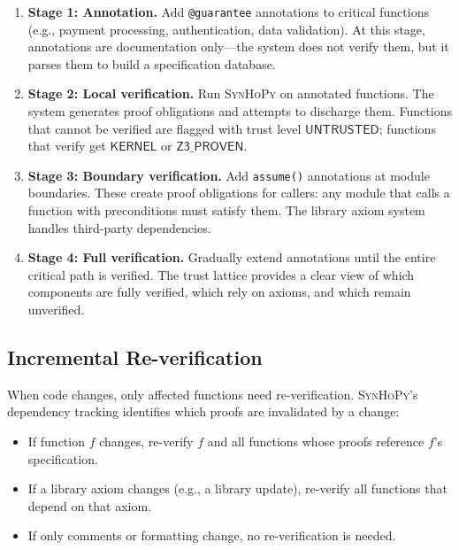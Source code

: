 \documentclass[11pt,a4paper]{report}
\theoremstyle{definition}
\theoremstyle{plain}
\newcommand{\synhopy}{\textsc{SynHoPy}}
\begin{document}
\begin{enumerate}
  \item \textbf{Stage 1: Annotation.}  Add \lstinline[style=synhopy]{@guarantee}
    annotations to critical functions (e.g., payment processing, authentication,
    data validation).  At this stage, annotations are documentation only---the
    system does not verify them, but it parses them to build a specification
    database.

  \item \textbf{Stage 2: Local verification.}  Run \synhopy{} on annotated
    functions.  The system generates proof obligations and attempts to discharge
    them.  Functions that cannot be verified are flagged with trust level
    $\mathsf{UNTRUSTED}$; functions that verify get $\mathsf{KERNEL}$ or
    $\mathsf{Z3\_PROVEN}$.

  \item \textbf{Stage 3: Boundary verification.}  Add
    \lstinline[style=synhopy]{assume()} annotations at module boundaries.
    These create proof obligations for callers: any module that calls a
    function with preconditions must satisfy them.  The library axiom system
    handles third-party dependencies.

  \item \textbf{Stage 4: Full verification.}  Gradually extend annotations
    until the entire critical path is verified.  The trust lattice provides
    a clear view of which components are fully verified, which rely on
    axioms, and which remain unverified.
\end{enumerate}

\subsection{Incremental Re-verification}

When code changes, only affected functions need re-verification.  \synhopy{}'s
dependency tracking identifies which proofs are invalidated by a change:

\begin{itemize}
  \item If function $f$ changes, re-verify $f$ and all functions whose proofs
    reference $f$'s specification.
  \item If a library axiom changes (e.g., a library update), re-verify all
    functions that depend on that axiom.
  \item If only comments or formatting change, no re-verification is needed.
\end{itemize}
\end{document}
